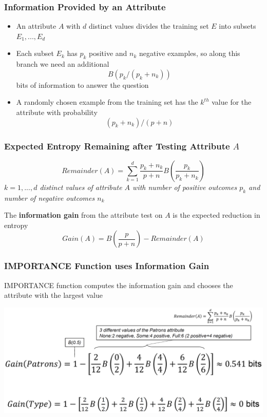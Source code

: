 \documentclass[conference]{styles/acmsiggraph}
\begin{document}
        \subsubsection{Information Provided by an Attribute}
            \begin{itemize}
                \item An attribute $A$ with $d$ distinct values divides the training set $E$ into subsets $E_1,...,E_d$
                \item Each subset $E_k$ has $p_k$ positive and $n_k$ negative examples, so along this branch we need an additional
                $$B(p_k \slash (p_k + n_k))$$
                bits of information to answer the question
                \item A randomly chosen example from the training set has the $k^{th}$ value for the attribute with probability
                $$(p_k + n_k) \slash (p + n)$$
            \end{itemize}
            
        \subsubsection{Expected Entropy Remaining after Testing Attribute $A$}
            $$Remainder(A) = \sum\limits_{k=1}^d \frac{p_k + n_k}{p+n} B \left( \frac{p_k}{p_k + n_k} \right)$$
            \textit{$k=1,...,d$ distinct values of attribute $A$ with number of positive outcomes $p_k$ and number of negative outcomes $n_k$}
            
            The \textbf{information gain} from the attribute test on $A$ is the expected reduction in entropy
            $$Gain(A) = B \left( \frac{p}{p+n} \right) - Remainder(A)$$
        
        \subsubsection{IMPORTANCE Function uses Information Gain}
            IMPORTANCE function computes the information gain and chooses the attribute with the largest value\newline
            
            \includegraphics[width=1\textwidth]{imgs/ImportantFunction.png}
            
\end{document}
